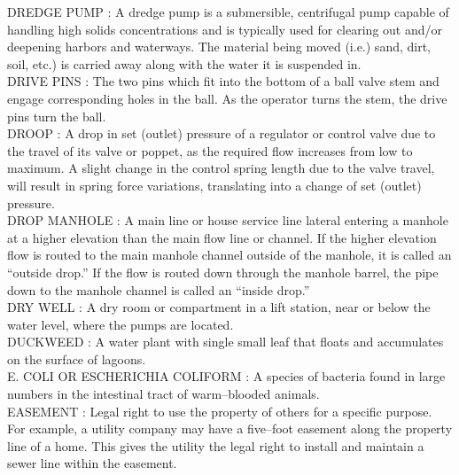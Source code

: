 DREDGE PUMP :   A dredge pump is a submersible, centrifugal pump capable of handling high solids concentrations and is typically used for clearing out and/or deepening harbors and waterways. The material being moved (i.e.) sand, dirt, soil, etc.) is carried away along with the water it is suspended in.\\
\vspace{0.15cm}
DRIVE PINS :   The two pins which fit into the bottom of a ball valve stem and engage corresponding holes in the ball. As the operator turns the stem, the drive pins turn the ball.\\
\vspace{0.15cm}
DROOP :   A drop in set (outlet) pressure of a regulator or control valve due to the travel of its valve or poppet, as the required flow increases from low to maximum. A slight change in the control spring length due to the valve travel, will result in spring force variations, translating into a change of set (outlet) pressure.\\
\vspace{0.15cm}
DROP MANHOLE :  A main line or house service line lateral entering a manhole at a higher elevation than the main flow line or channel. If the higher elevation flow is routed to the main manhole channel outside of the manhole, it is called an “outside drop.” If the flow is routed down through the manhole barrel, the pipe down to the manhole channel is called an “inside drop.” \\
\vspace{0.15cm}
DRY WELL :  A dry room or compartment in a lift station, near or below the water level, where the pumps are located. \\
\vspace{0.15cm}
DUCKWEED :  A water plant with single small leaf that floats and accumulates on the surface of lagoons.\\
\vspace{0.15cm}
E. COLI OR ESCHERICHIA COLIFORM :   A species of bacteria found in large numbers in the intestinal tract of warm–blooded animals.\\
\vspace{0.15cm}
EASEMENT :  Legal right to use the property of others for a specific purpose. For example, a utility company may have a five–foot easement along the property line of a home. This gives the utility the legal right to install and maintain a sewer line within the easement. \\
\vspace{0.15cm}
